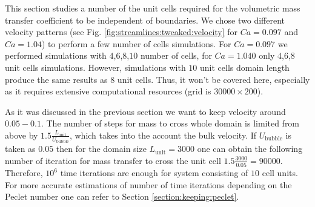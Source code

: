 \documentclass{article}
\newcommand{\lunit}{L_{\mathrm{unit}}}
\newcommand{\ububble}{U_{\mathrm{bubble}}}
\begin{document}
This section studies a number of the unit cells required for the volumetric
mass transfer coefficient to be independent of boundaries. We chose two
different
velocity patterns (see Fig. \ref{fig:streamlines:tweaked:velocity} for $Ca=0.097$ and $Ca=1.04$) to
perform a few number of cells simulations. For $Ca=0.097$ we performed simulations with
$4$,$6$,$8$,$10$ number of cells, for $Ca=1.040$ only $4$,$6$,$8$ unit cells simulations.
However,
simulations with $10$ unit cells domain length produce the same results as $8$ unit cells.
Thus, it won't be covered here, especially as it requires extensive computational resources (grid is
$30000\times 200$). 

As it was discussed in the previous section we want to keep
velocity around $0.05-0.1$. The number of steps for mass to cross whole domain is
limited from above by $1.5 \frac{\lunit}{\ububble}$, which takes into the account the bulk
velocity. If $\ububble$ is taken as $0.05$ then for
the domain size $\lunit=3000$ one can obtain the following number of iteration for mass transfer to
cross the unit cell $1.5 \frac{3000}{0.05}=90000$. Therefore, $10^{6}$ time iterations are enough
for system consisting of $10$ cell units. For more accurate estimations of number of time
iterations depending
on the Peclet number one can refer to Section \ref{section:keeping:peclet}.
\end{document}
